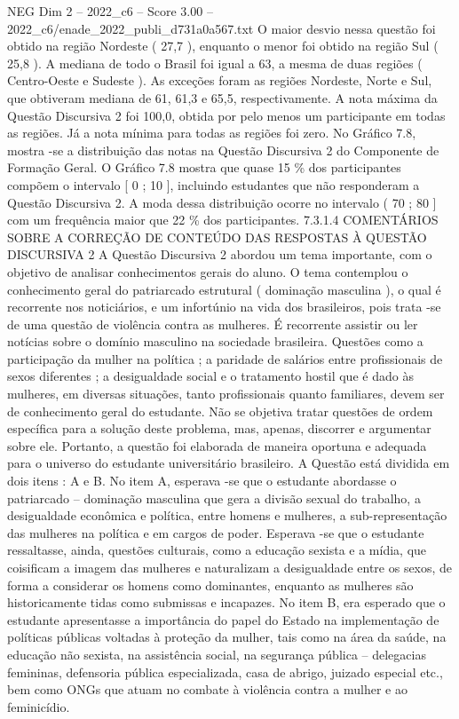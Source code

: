 \begin{textsample}{NEG Dim 2 – 2022\_c6 – Score 3.00 – 2022\_c6/enade\_2022\_publi\_d731a0a567.txt}
O maior desvio nessa questão foi obtido na região Nordeste ( 27,7 ), enquanto o menor foi obtido na região Sul ( 25,8 ).
A mediana de todo o Brasil foi igual a 63, a mesma de duas regiões ( Centro-Oeste e Sudeste ).
As exceções foram as regiões Nordeste, Norte e Sul, que obtiveram mediana de 61, 61,3 e 65,5, respectivamente.
A nota máxima da Questão Discursiva 2 foi 100,0, obtida por pelo menos um participante em todas as regiões.
Já a nota mínima para todas as regiões foi zero.
No Gráfico 7.8, mostra -se a distribuição das notas na Questão Discursiva 2 do Componente de Formação Geral.
O Gráfico 7.8 mostra que quase 15 \% dos participantes compõem o intervalo [ 0 ; 10 ], incluindo estudantes que não responderam a Questão Discursiva 2.
A moda dessa distribuição ocorre no intervalo ( 70 ; 80 ] com um frequência maior que 22 \% dos participantes. 7.3.1.4 COMENTÁRIOS SOBRE A CORREÇÃO DE CONTEÚDO DAS RESPOSTAS À QUESTÃO DISCURSIVA 2 A Questão Discursiva 2 abordou um tema importante, com o objetivo de analisar conhecimentos gerais do aluno.
O tema contemplou o conhecimento geral do patriarcado estrutural ( dominação masculina ), o qual é recorrente nos noticiários, e um infortúnio na vida dos brasileiros, pois trata -se de uma questão de violência contra as mulheres.
É recorrente assistir ou ler notícias sobre o domínio masculino na sociedade brasileira.
Questões como a participação da mulher na política ; a paridade de salários entre profissionais de sexos diferentes ; a desigualdade social e o tratamento hostil que é dado às mulheres, em diversas situações, tanto profissionais quanto familiares, devem ser de conhecimento geral do estudante.
Não se objetiva tratar questões de ordem específica para a solução deste problema, mas, apenas, discorrer e argumentar sobre ele.
Portanto, a questão foi elaborada de maneira oportuna e adequada para o universo do estudante universitário brasileiro.
A Questão está dividida em dois itens : A e B.
No item A, esperava -se que o estudante abordasse o patriarcado – dominação masculina que gera a divisão sexual do trabalho, a desigualdade econômica e política, entre homens e mulheres, a sub-representação das mulheres na política e em cargos de poder.
Esperava -se que o estudante ressaltasse, ainda, questões culturais, como a educação sexista e a mídia, que coisificam a imagem das mulheres e naturalizam a desigualdade entre os sexos, de forma a considerar os homens como dominantes, enquanto as mulheres são historicamente tidas como submissas e incapazes.
No item B, era esperado que o estudante apresentasse a importância do papel do Estado na implementação de políticas públicas voltadas à proteção da mulher, tais como na área da saúde, na educação não sexista, na assistência social, na segurança pública – delegacias femininas, defensoria pública especializada, casa de abrigo, juizado especial etc., bem como ONGs que atuam no combate à violência contra a mulher e ao feminicídio.

\end{textsample}
